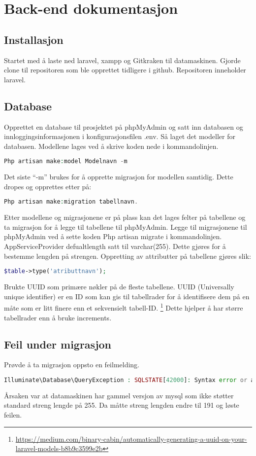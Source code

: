 \clearpage
\section{Back-end dokumentasjon}
\subsection{Installasjon}
Startet med å laste ned laravel, xampp og Gitkraken til datamaskinen. Gjorde clone til repositoren som ble opprettet tidligere i github. Repositoren inneholder laravel. 

\subsection{Database}
Opprettet en database til prosjektet på phpMyAdmin og satt inn databasen og innloggingsinformasjonen i konfigurasjonsfilen .env. Så laget det modeller for databasen. Modellene lages ved å skrive koden nede i kommandolinjen. 
\begin{lstlisting}[language=PHP]
    Php artisan make:model Modelnavn -m
\end{lstlisting}  
Det siste “-m” brukes for å opprette migrasjon for modellen  samtidig. Dette dropes og opprettes etter på: 
 \begin{lstlisting}[language=PHP]
    Php artisan make:migration tabellnavn.
\end{lstlisting}
Etter modellene og migrasjonene er på plass kan det lages felter på tabellene og ta migrasjon for å legge til tabellene til phpMyAdmin. Legge til migrasjonene til phpMyAdmin ved å sette koden Php artisan migrate  i kommandolinjen.
AppServiceProvider defualtlength satt til varchar(255). Dette gjøres for å bestemme lengden på strengen.
Oppretting av  attributter på tabellene gjøres slik: 

\begin{lstlisting}[language=PHP]
    $table->type('atributtnavn');
\end{lstlisting}

Brukte UUID som primære nøkler på de fleste  tabellene. UUID (Universally unique identifier) er en ID som kan gis til tabellrader for å identifisere dem på en måte som er litt finere enn et sekvensielt tabell-ID. \footnote{\url{https://medium.com/binary-cabin/automatically-generating-a-uuid-on-your-laravel-models-b8b9c3599e2b}} Dette hjelper å har større tabellrader enn å bruke increments.

\subsection{Feil under migrasjon}
Prøvde å ta migrasjon oppsto en feilmelding.
\begin{lstlisting}[language=PHP]
Illuminate\Database\QueryException : SQLSTATE[42000]: Syntax error or access violation: 1071 Specified key was too long; max key length is 767 bytes (SQL: alter table `users` add unique `users_email_unique`(`email`))
\end{lstlisting}
Årsaken var at datamaskinen har gammel versjon av mysql som ikke støtter standard streng lengde på 255. Da måtte streng lengden endre til 191 og løste feilen.

